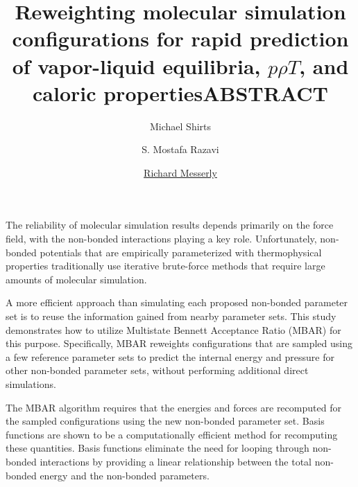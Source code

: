 \documentclass[11pt,a4paper]{article}
\begin{document}
	\thispagestyle{empty}
	\title{\Large \textbf{Reweighting molecular simulation configurations for rapid prediction of vapor-liquid equilibria, $p\rho T$, and caloric properties}}
	\author[2]{\large {Michael Shirts}}
	\author[3]{\large {S. Mostafa Razavi}}
	\author[1]{\large {\underline{Richard Messerly}}}%
	
	
	
	\date{} %
	\maketitle\thispagestyle{empty} %
	\begin{center}
		\title{\textbf{ABSTRACT}}\centering{}
	\end{center}
	\justify
	
	
	
	The reliability of molecular simulation results depends primarily on the force field, with the non-bonded interactions playing a key role. Unfortunately, non-bonded potentials that are empirically parameterized with thermophysical properties traditionally use iterative brute-force methods that require large amounts of molecular simulation. 
	
	A more efficient approach than simulating each proposed non-bonded parameter set is to reuse the information gained from nearby parameter sets. This study demonstrates how to utilize Multistate Bennett Acceptance Ratio (MBAR) for this purpose. Specifically, MBAR reweights configurations that are sampled using a few reference parameter sets to predict the internal energy and pressure for other non-bonded parameter sets, without performing additional direct simulations. 
	
	The MBAR algorithm requires that the energies and forces are recomputed for the sampled configurations using the new non-bonded parameter set. Basis functions are shown to be a computationally efficient method for recomputing these quantities. Basis functions eliminate the need for looping through non-bonded interactions by providing a linear relationship between the total non-bonded energy and the non-bonded parameters. 
	
\end{document}
